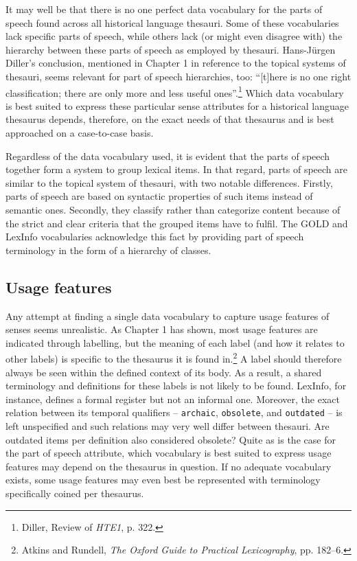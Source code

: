 It may well be that there is no one perfect data vocabulary for the parts of speech found across all historical language thesauri. Some of these vocabularies lack specific parts of speech, while others lack (or might even disagree with) the hierarchy between these parts of speech as employed by thesauri. Hans-Jürgen Diller's conclusion, mentioned in Chapter 1 in reference to the topical systems of thesauri, seems relevant for part of speech hierarchies, too: ``[t]here is no one right classification; there are only more and less useful ones''.\footnote{Diller, Review of \textit{HTE1}, p. 322.} Which data vocabulary is best suited to express these particular sense attributes for a historical language thesaurus depends, therefore, on the exact needs of that thesaurus and is best approached on a case-to-case basis. %

Regardless of the data vocabulary used, it is evident that the parts of speech together form a system to group lexical items. In that regard, parts of speech are similar to the topical system of thesauri, with two notable differences. Firstly, parts of speech are based on syntactic properties of such items instead of semantic ones. Secondly, they classify rather than categorize content because of the strict and clear criteria that the grouped items have to fulfil. The GOLD and LexInfo vocabularies acknowledge this fact by providing part of speech terminology in the form of a hierarchy of classes. %

\subsection{Usage features}
\label{sect:Stolk_thes-digital-form:semweb-uf}
Any attempt at finding a single data vocabulary to capture usage features of senses seems unrealistic. As Chapter 1 has shown, most usage features are indicated through labelling, but the meaning of each label (and how it relates to other labels) is specific to the thesaurus it is found in.\footnote{Atkins and Rundell, \textit{The Oxford Guide to Practical Lexicography}, pp. 182–6.} A label should therefore always be seen within the defined context of its body. As a result, a shared terminology and definitions for these labels is not likely to be found. LexInfo, for instance, defines a formal register but not an informal one. Moreover, the exact relation between its temporal qualifiers -- \texttt{archaic}, \texttt{obsolete}, and \texttt{outdated} -- is left unspecified and such relations may very well differ between thesauri. Are outdated items per definition also considered obsolete? Quite as is the case for the part of speech attribute, which vocabulary is best suited to express usage features may depend on the thesaurus in question. If no adequate vocabulary exists, some usage features may even best be represented with terminology specifically coined per thesaurus.

